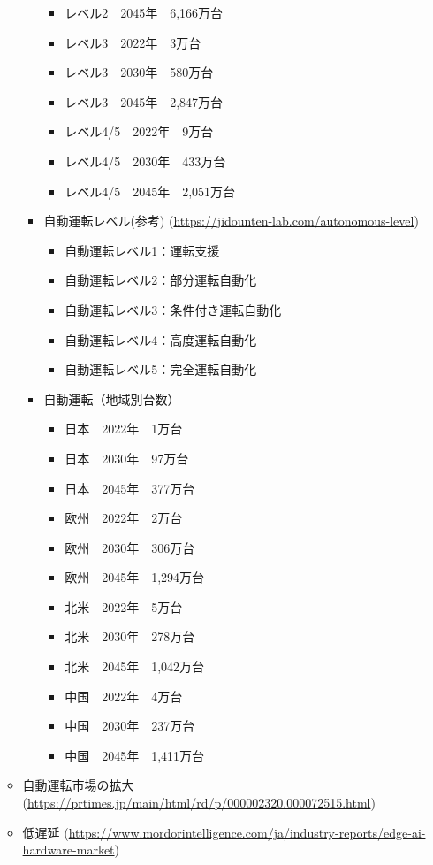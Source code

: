 \begin{itemize}
\begin{itemize}
\begin{itemize}
\begin{itemize}
				\item レベル2　2045年　6,166万台
				\item レベル3　2022年　3万台
				\item レベル3　2030年　580万台
				\item レベル3　2045年　2,847万台
				\item レベル4/5　2022年　9万台
				\item レベル4/5　2030年　433万台
				\item レベル4/5　2045年　2,051万台
			\end{itemize}
			\item 自動運転レベル(参考) (\url{https://jidounten-lab.com/autonomous-level})
			\begin{itemize}
				\item 自動運転レベル1：運転支援
				\item 自動運転レベル2：部分運転自動化
				\item 自動運転レベル3：条件付き運転自動化
				\item 自動運転レベル4：高度運転自動化
				\item 自動運転レベル5：完全運転自動化
			\end{itemize}
			\item 自動運転（地域別台数）
			\begin{itemize}
				\item 日本　2022年　1万台
				\item 日本　2030年　97万台
				\item 日本　2045年　377万台
				\item 欧州　2022年　2万台
				\item 欧州　2030年　306万台
				\item 欧州　2045年　1,294万台
				\item 北米　2022年　5万台
				\item 北米　2030年　278万台
				\item 北米　2045年　1,042万台
				\item 中国　2022年　4万台
				\item 中国　2030年　237万台
				\item 中国　2045年　1,411万台
			\end{itemize}
		\end{itemize}
		\item 自動運転市場の拡大 (\url{https://prtimes.jp/main/html/rd/p/000002320.000072515.html})
		\item 低遅延 (\url{https://www.mordorintelligence.com/ja/industry-reports/edge-ai-hardware-market})

\end{itemize}
\end{itemize}
